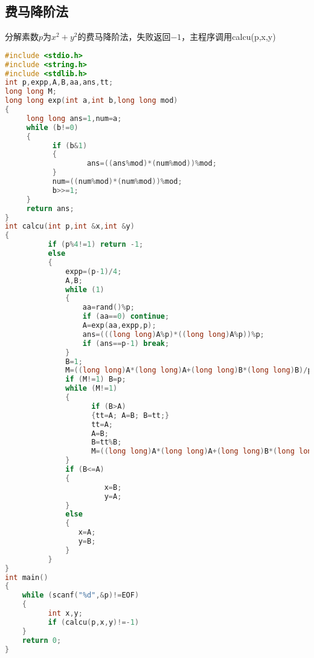 \subsection{费马降阶法}
	分解素数$p$为$x^2+y^2$的费马降阶法，失败返回$-1$，主程序调用calcu(p,x,y)
	\begin{lstlisting}[language=c++]
#include <stdio.h>
#include <string.h>
#include <stdlib.h>
int p,expp,A,B,aa,ans,tt;
long long M;
long long exp(int a,int b,long long mod)
{
	 long long ans=1,num=a;
	 while (b!=0)
	 {
		   if (b&1)
		   {
				   ans=((ans%mod)*(num%mod))%mod;
		   }
		   num=((num%mod)*(num%mod))%mod;
		   b>>=1;
	 }
	 return ans;
}
int calcu(int p,int &x,int &y)
{
		  if (p%4!=1) return -1;
		  else
		  {
			  expp=(p-1)/4;
			  A,B;
			  while (1)
			  {
				  aa=rand()%p;
				  if (aa==0) continue;
				  A=exp(aa,expp,p);
				  ans=(((long long)A%p)*((long long)A%p))%p;
				  if (ans==p-1) break;
			  }
			  B=1;
			  M=((long long)A*(long long)A+(long long)B*(long long)B)/p;
			  if (M!=1) B=p;
			  while (M!=1)
			  {
					if (B>A)
					{tt=A; A=B; B=tt;}
					tt=A;
					A=B;
					B=tt%B;
					M=((long long)A*(long long)A+(long long)B*(long long)B)/p;
			  }
			  if (B<=A)
			  {
					   x=B;
					   y=A;
			  }
			  else
			  {
				 x=A;
				 y=B;
			  }
		  }
}
int main()
{
	while (scanf("%d",&p)!=EOF)
	{
		  int x,y;
		  if (calcu(p,x,y)!=-1)
	}
	return 0;
}
	\end{lstlisting}